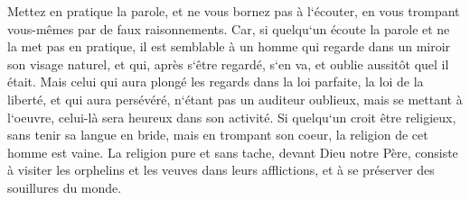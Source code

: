 \verse Mettez en pratique la parole, et ne vous bornez pas à l`écouter, en vous trompant vous-mêmes par de faux raisonnements. 
\verse Car, si quelqu`un écoute la parole et ne la met pas en pratique, il est semblable à un homme qui regarde dans un miroir son visage naturel, 
\verse et qui, après s`être regardé, s`en va, et oublie aussitôt quel il était. 
\verse Mais celui qui aura plongé les regards dans la loi parfaite, la loi de la liberté, et qui aura persévéré, n`étant pas un auditeur oublieux, mais se mettant à l`oeuvre, celui-là sera heureux dans son activité. 
\verse Si quelqu`un croit être religieux, sans tenir sa langue en bride, mais en trompant son coeur, la religion de cet homme est vaine. 
\verse La religion pure et sans tache, devant Dieu notre Père, consiste à visiter les orphelins et les veuves dans leurs afflictions, et à se préserver des souillures du monde. 

